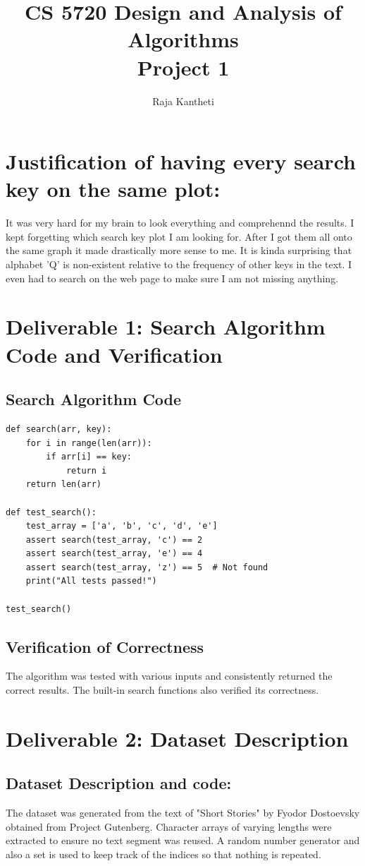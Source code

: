 \documentclass{article}
\title{CS 5720 Design and Analysis of Algorithms \\ Project 1}
\author{Raja Kantheti}
\date{}
\begin{document}
\maketitle

\section*{Justification of having every search key on the same plot: }
It was very hard for my brain to look everything and comprehennd the results. I kept forgetting which search key plot I am looking for. After I got them all onto the same graph it made drastically more sense to me. It is kinda surprising that alphabet 'Q' is non-existent relative to the frequency of other keys in the text. 
I even had to search on the web page to make sure I am not missing anything. 
\section*{Deliverable 1: Search Algorithm Code and Verification}

\subsection*{Search Algorithm Code}
\begin{verbatim}
def search(arr, key):
    for i in range(len(arr)):
        if arr[i] == key:
            return i
    return len(arr)

def test_search():
    test_array = ['a', 'b', 'c', 'd', 'e']
    assert search(test_array, 'c') == 2
    assert search(test_array, 'e') == 4
    assert search(test_array, 'z') == 5  # Not found
    print("All tests passed!")

test_search()
\end{verbatim}

\subsection*{Verification of Correctness}
The algorithm was tested with various inputs and consistently returned the correct results. The built-in search functions also verified its correctness.

\section*{Deliverable 2: Dataset Description}

\subsection*{Dataset Description and code: }
The dataset was generated from the text of "Short Stories" by Fyodor Dostoevsky obtained from Project Gutenberg. 
Character arrays of varying lengths were extracted to ensure no text segment was reused.
A random number generator and also a set is used to keep track of the indices so that nothing is repeated. 
\end{document}
